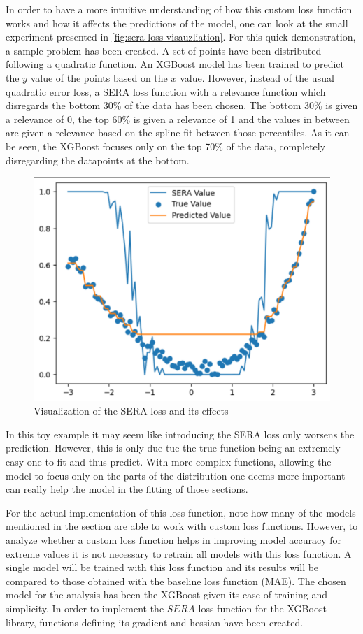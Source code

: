 In order to have a more intuitive understanding of how this custom loss function works and how it affects the predictions of the model, one can look at the small experiment presented in \autoref{fig:sera-loss-visauzliation}. For this quick demonstration, a sample problem has been created. A set of points have been distributed following a quadratic function. An XGBoost model has been trained to predict the $y$ value of the points based on the $x$ value. However, instead of the usual quadratic error loss, a SERA loss function with a relevance function which disregards the bottom 30\% of the data has been chosen. The bottom 30\% is given a relevance of 0, the top 60\% is given a relevance of 1 and the values in between are given a relevance based on the spline fit between those percentiles. As it can be seen, the XGBoost focuses only on the top 70\% of the data, completely disregarding the datapoints at the bottom. 
\begin{figure}[ht]
    \centering
    \captionsetup{justification=centering}
    \includegraphics[width=0.7\linewidth]{assets/sera-loss-visualization.png}
    \caption{Visualization of the SERA loss and its effects}
    \label{fig:sera-loss-visualization}
\end{figure}
In this toy example it may seem like introducing the SERA loss only worsens the prediction. However, this is only due tue the true function being an extremely easy one to fit and thus predict. With more complex functions, allowing the model to focus only on the parts of the distribution one deems more important can really help the model in the fitting of those sections. 

For the actual implementation of this loss function, note how many of the models mentioned in the  section are able to work with custom loss functions. However, to analyze whether a custom loss function helps in improving model accuracy for extreme values it is not necessary to retrain all models with this loss function. A single model will be trained with this loss function and its results will be compared to those obtained with the baseline loss function (MAE). The chosen model for the analysis has been the XGBoost given its ease of training and simplicity. In order to implement the $SERA$ loss function for the XGBoost library, functions defining its gradient and hessian have been created.
